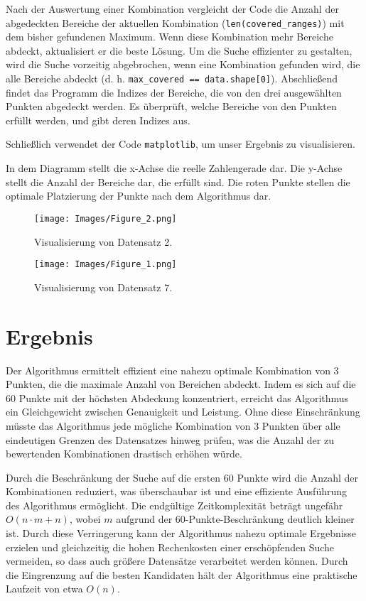 Nach der Auswertung einer Kombination vergleicht der Code die Anzahl der abgedeckten Bereiche der aktuellen Kombination (\texttt{len(covered\_ranges)}) mit dem bisher gefundenen Maximum. Wenn diese Kombination mehr Bereiche abdeckt, aktualisiert er die beste Lösung. Um die Suche effizienter zu gestalten, wird die Suche vorzeitig abgebrochen, wenn eine Kombination gefunden wird, die alle Bereiche abdeckt (d. h. \texttt{max\_covered == data.shape[0]}). Abschließend findet das Programm die Indizes der Bereiche, die von den drei ausgewählten Punkten abgedeckt werden. Es überprüft, welche Bereiche von den Punkten erfüllt werden, und gibt deren Indizes aus.


Schließlich verwendet der Code \texttt{matplotlib}, um unser Ergebnis zu visualisieren.

In dem Diagramm stellt die x-Achse die reelle Zahlengerade dar. Die y-Achse stellt die Anzahl der Bereiche dar, die erfüllt sind. Die roten Punkte stellen die optimale Platzierung der Punkte nach dem Algorithmus dar.
\begin{figure}[htbp]
\centering
\texttt{[image: Images/Figure\_2.png]}
\caption{Visualisierung von Datensatz 2.}
\label{fig:figure2}
\end{figure}

\begin{figure}[htbp]
\centering
\texttt{[image: Images/Figure\_1.png]}
\caption{Visualisierung von Datensatz 7.}
\label{fig:figure1}
\end{figure}


\section{Ergebnis}

Der Algorithmus ermittelt effizient eine nahezu optimale Kombination von 3 Punkten, die die maximale Anzahl von Bereichen abdeckt. Indem es sich auf die 60 Punkte mit der höchsten Abdeckung konzentriert, erreicht das Algorithmus ein Gleichgewicht zwischen Genauigkeit und Leistung. Ohne diese Einschränkung müsste das Algorithmus jede mögliche Kombination von 3 Punkten über alle eindeutigen Grenzen des Datensatzes hinweg prüfen, was die Anzahl der zu bewertenden Kombinationen drastisch erhöhen würde.

Durch die Beschränkung der Suche auf die ersten 60 Punkte wird die Anzahl der Kombinationen reduziert, was überschaubar ist und eine effiziente Ausführung des Algorithmus ermöglicht. Die endgültige Zeitkomplexität beträgt ungefähr $O(n \cdot m + n)$, wobei $m$ aufgrund der 60-Punkte-Beschränkung deutlich kleiner ist. Durch diese Verringerung kann der Algorithmus nahezu optimale Ergebnisse erzielen und gleichzeitig die hohen Rechenkosten einer erschöpfenden Suche vermeiden, so dass auch größere Datensätze verarbeitet werden können. Durch die Eingrenzung auf die besten Kandidaten hält der Algorithmus eine praktische Laufzeit von etwa $O(n)$.



